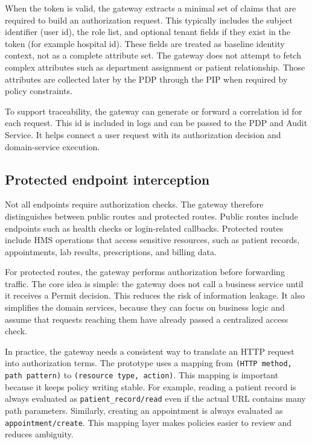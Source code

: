 When the token is valid, the gateway extracts a minimal set of claims that are required to build an authorization request.
This typically includes the subject identifier (user id), the role list, and optional tenant fields if they exist in the
token (for example hospital id). These fields are treated as baseline identity context, not as a complete attribute set.
The gateway does not attempt to fetch complex attributes such as department assignment or patient relationship. Those
attributes are collected later by the PDP through the PIP when required by policy constraints.

\vspace{0.5cm}


To support traceability, the gateway can generate or forward a correlation id for each request. This id is included in
logs and can be passed to the PDP and Audit Service. It helps connect a user request with its authorization decision and
domain-service execution.

\subsection{Protected endpoint interception}
\label{subsec:gateway_protected}

Not all endpoints require authorization checks. The gateway therefore distinguishes between public routes and protected
routes. Public routes include endpoints such as health checks or login-related callbacks. Protected routes include HMS
operations that access sensitive resources, such as patient records, appointments, lab results, prescriptions, and billing
data.
\vspace{0.5cm}


For protected routes, the gateway performs authorization before forwarding traffic. The core idea is simple: the gateway
does not call a business service until it receives a Permit decision. This reduces the risk of information leakage. It
also simplifies the domain services, because they can focus on business logic and assume that requests reaching them have
already passed a centralized access check.
\vspace{0.5cm}


In practice, the gateway needs a consistent way to translate an HTTP request into authorization terms. The prototype uses a
mapping from \texttt{(HTTP method, path pattern)} to \texttt{(resource type, action)}. This mapping is important because it
keeps policy writing stable. For example, reading a patient record is always evaluated as \texttt{patient\_record/read}
even if the actual URL contains many path parameters. Similarly, creating an appointment is always evaluated as
\texttt{appointment/create}. This mapping layer makes policies easier to review and reduces ambiguity.

